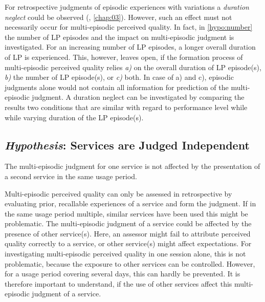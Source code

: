 For retrospective judgments of episodic experiences with variations a \emph{duration neglect} could be observed (\cf, \autoref{chap:03}).
However, such an effect must not necessarily occur for multi-episodic perceived quality.
In fact, in \autoref{hypo:number} the number of \ac{LP} episodes and the impact on multi-episodic judgment is investigated.
For an increasing number of \ac{LP} episodes, a longer overall duration of \ac{LP} is experienced.
This, however, leaves open, if the formation process of multi-episodic perceived quality relies \emph{a)} on the overall duration of \ac{LP} episode(s), \emph{b)} the number of \ac{LP} episode(s), or \emph{c)} both.
In case of a) and c), episodic judgments alone would not contain all information for prediction of the multi-episodic judgment.
A duration neglect can be investigated by comparing the results two conditions that are similar with regard to performance level while while varying duration of the \ac{LP} episode(s).

\subsection{\emph{Hypothesis}: Services are Judged Independent}
\begin{hypothesis}\label{hypo:independent}
The multi-episodic judgment for one service is not affected by the presentation of a second service in the same usage period.
\end{hypothesis}

Multi-episodic perceived quality can only be assessed in retrospective by evaluating prior, recallable experiences of a service and form the judgment.
If in the same usage period multiple, similar services have been used this might be problematic.
The multi-episodic judgment of a service could be affected by the presence of other service(s).
Here, an assessor might fail to attribute perceived quality correctly to a service, or other service(s) might affect expectations.
For investigating multi-episodic perceived quality in one session alone, this is not problematic, because the exposure to other services can be controlled.
However, for a usage period covering several days, this can hardly be prevented.
It is therefore important to understand, if the use of other services affect this multi-episodic judgment of a service.

